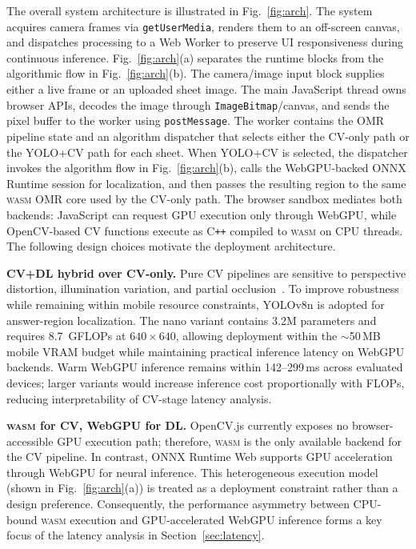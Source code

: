 \documentclass[conference]{IEEEtran}
\newcommand{\wasm}{\textsc{wasm}}
\begin{document}
The overall system architecture is illustrated in Fig.~\ref{fig:arch}. The system acquires camera frames via \texttt{getUserMedia}, renders them to an off-screen canvas, and dispatches processing to a Web Worker to preserve UI responsiveness during continuous inference. Fig.~\ref{fig:arch}(a) separates the runtime blocks from the algorithmic flow in Fig.~\ref{fig:arch}(b). The camera/image input block supplies either a live frame or an uploaded sheet image. The main JavaScript thread owns browser APIs, decodes the image through \texttt{ImageBitmap}/canvas, and sends the pixel buffer to the worker using \texttt{postMessage}. The worker contains the OMR pipeline state and an algorithm dispatcher that selects either the CV-only path or the YOLO+CV path for each sheet. When YOLO+CV is selected, the dispatcher invokes the algorithm flow in Fig.~\ref{fig:arch}(b), calls the WebGPU-backed ONNX Runtime session for localization, and then passes the resulting region to the same \wasm{} OMR core used by the CV-only path. The browser sandbox mediates both backends: JavaScript can request GPU execution only through WebGPU, while OpenCV-based CV functions execute as C\texttt{++} compiled to \wasm{} on CPU threads. The following design choices motivate the deployment architecture.

\textbf{CV+DL hybrid over CV-only.}
Pure CV pipelines are sensitive to perspective distortion, illumination variation, and partial occlusion~\cite{afifi2019}.
To improve robustness while remaining within mobile resource constraints, YOLOv8n is adopted for answer-region localization. The nano variant contains 3.2M parameters and requires 8.7~GFLOPs at $640\times640$, allowing deployment within the $\sim$50\,MB mobile VRAM budget while maintaining practical inference latency on WebGPU backends. Warm WebGPU inference remains within 142--299\,ms across evaluated devices; larger variants would increase inference cost proportionally with FLOPs, reducing interpretability of CV-stage latency analysis.

\textbf{\wasm{} for CV, WebGPU for DL.}
OpenCV.js currently exposes no browser-accessible GPU execution path; therefore, \wasm{} is the only available backend for the CV pipeline. In contrast, ONNX Runtime Web supports GPU acceleration through WebGPU for neural inference.
This heterogeneous execution model (shown in Fig.~\ref{fig:arch}(a)) is treated as a deployment constraint
rather than a design preference. Consequently, the performance asymmetry between CPU-bound \wasm{} execution and GPU-accelerated WebGPU inference forms a key focus of the latency analysis in Section~\ref{sec:latency}.
\end{document}
